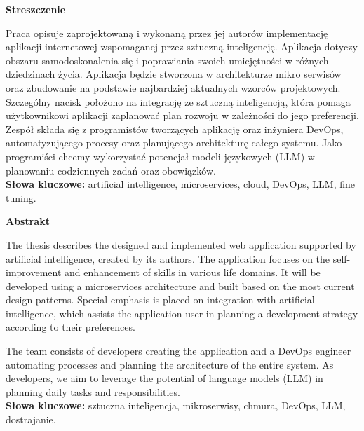 \begin{center}
    {\bf\Large{Streszczenie}}\\
\end{center}
Praca opisuje zaprojektowaną i wykonaną przez jej autorów implementację
aplikacji internetowej wspomaganej przez sztuczną inteligencję. Aplikacja dotyczy obszaru samodoskonalenia się i poprawiania swoich umiejętności w różnych dziedzinach życia. Aplikacja będzie stworzona w architekturze mikro serwisów oraz zbudowanie na podstawie najbardziej aktualnych wzorców projektowych.
Szczególny nacisk położono na integrację ze sztuczną inteligencją, która pomaga użytkownikowi aplikacji zaplanować plan rozwoju w zależności do jego preferencji.
Zespół składa się z programistów tworzących aplikację oraz inżyniera DevOps, automatyzującego procesy oraz planującego architekturę całego systemu. Jako programiści chcemy wykorzystać potencjał modeli językowych (LLM) w planowaniu codziennych zadań oraz obowiązków.
\\
{\bf Słowa kluczowe:} artificial intelligence, microservices, cloud, DevOps, LLM, fine tuning.
\clearpage

\begin{center}
    {\bf\Large{Abstrakt}}\\
\end{center}
The thesis describes the designed and implemented web application supported by artificial intelligence, created by its authors. The application focuses on the self-improvement and enhancement of skills in various life domains. It will be developed using a microservices architecture and built based on the most current design patterns. Special emphasis is placed on integration with artificial intelligence, which assists the application user in planning a development strategy according to their preferences.

The team consists of developers creating the application and a DevOps engineer automating processes and planning the architecture of the entire system. As developers, we aim to leverage the potential of language models (LLM) in planning daily tasks and responsibilities.
\\
{\bf Słowa kluczowe:} sztuczna inteligencja, mikroserwisy, chmura, DevOps, LLM, dostrajanie.